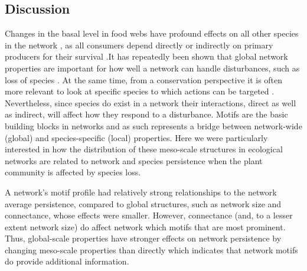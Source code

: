 \documentclass[12pt]{article}
\begin{document}
\begin{spacing}{2.0}
\section*{Discussion}


Changes in the basal level in food webs have profound effects on all other species in the network \citep{}, as all consumers depend directly or indirectly on primary producers for their survival \citep{}.It has repeatedly been shown that global network properties are important for how well a network can handle disturbances, such as loss of species \citep{Eklof2006, Dunne2002}. At the same time, from a conservation perspective it is often more relevant to look at specific species to which actions can be targeted \cite{}. Nevertheless, since species do exist in a network their interactions, direct as well as indirect, will affect how they respond to a disturbance. Motifs are the basic building blocks in networks and as such represents a bridge between network-wide (global) and species-specific (local) properties. Here we were particularly interested in how the distribution of these meso-scale structures in ecological networks are related to network and species persistence when the plant community is affected by species loss.

A network's motif profile had relatively strong relationships to the network average persistence, compared to global structures, such as network size and connectance, whose effects were smaller. However, connectance (and, to a lesser extent network size) do affect network which motifs that are most prominent. Thus, global-scale properties have stronger effects on network persistence by changing meso-scale properties than directly which indicates that network motifs do provide additional information.  


\end{spacing}
\end{document}

